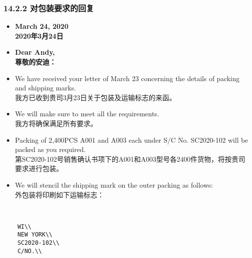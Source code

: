 \documentclass[12pt]{beamer}
\begin{document}
 
    \begin{frame}[allowframebreaks]
    \frametitle{14.2.2 对包装要求的回复}
    \begin{itemize}
    \item \textbf{March 24, 2020} \\
    \textbf{2020年3月24日}
    
    \item \textbf{Dear Andy,} \\
    \textbf{尊敬的安迪：}
    
    \item We have received your letter of March 23 concerning the details of packing and shipping marks. \\
    我方已收到贵司3月23日关于包装及运输标志的来函。
    
    \item We will make sure to meet all the requirements. \\
    我方将确保满足所有要求。
    
    \item Packing of 2,400PCS A001 and A003 each under S/C No. SC2020-102 will be packed as you required. \\
    第SC2020-102号销售确认书项下的A001和A003型号各2400件货物，将按贵司要求进行包装。
    
    \item We will stencil the shipping mark on the outer packing as follows: \\
    外包装将印刷如下运输标志：
    \end{itemize}
\end{frame}

\    \begin{frame}
    \begin{verbatim}
    WI\\
    NEW YORK\\
    SC2020-102\\
    C/NO.\\
    \end{verbatim}
\end{frame}
\end{document}
